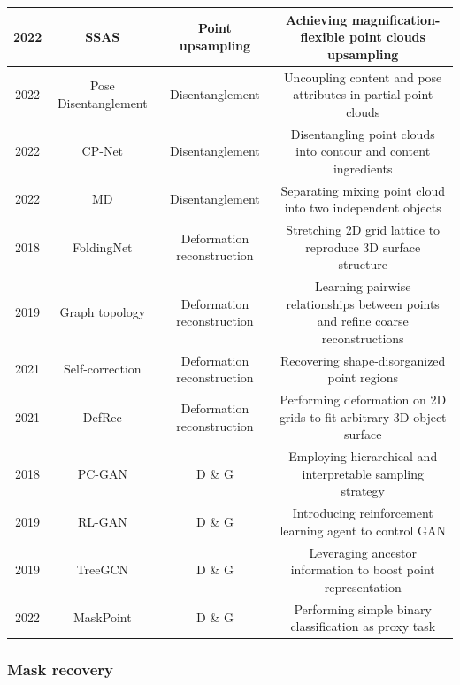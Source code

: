 \documentclass[a4paper,fleqn]{cas-dc}
\begin{document}
\begin{table}[]
{\begin{tabular}{|c|c|c|c|}
        2022 & SSAS \citep{zhao2022self} & Point upsampling & Achieving magnification-flexible point clouds upsampling \\\hline
        2022 & Pose Disentanglement \citep{tsai2022self} & Disentanglement & Uncoupling content and pose attributes in partial point clouds \\
        2022 & CP-Net \citep{xu2022cp} & Disentanglement & Disentangling point clouds into contour and content ingredients \\
        2022 & MD \citep{sun2022self} & Disentanglement & Separating mixing point cloud into two independent objects \\\hline
        2018 & FoldingNet \citep{yang2018foldingnet} & Deformation reconstruction & Stretching 2D grid lattice to reproduce 3D surface structure \\
        2019 & Graph topology \citep{chen2019deep} & Deformation reconstruction & Learning pairwise relationships between points and refine coarse reconstructions \\
        2021 & Self-correction \citep{chen2021shape} & Deformation reconstruction & Recovering shape-disorganized point regions \\
        2021 & DefRec \citep{achituve2021self} & Deformation reconstruction & Performing deformation on 2D grids to fit arbitrary 3D object surface \\\hline
        2018 & PC-GAN \citep{li2018point} & D \& G & Employing hierarchical and interpretable sampling strategy \\
        2019 & RL-GAN \citep{sarmad2019rl} & D \& G & Introducing reinforcement learning agent to control GAN \\
        2019 & TreeGCN \citep{shu20193d} & D \& G & Leveraging ancestor information to boost point representation \\
        2022 & MaskPoint \citep{liu2022masked} & D \& G & Performing simple binary classification as proxy task \\\hline
    \end{tabular}}
\end{table}


\subsubsection{Mask recovery}
\end{document}
